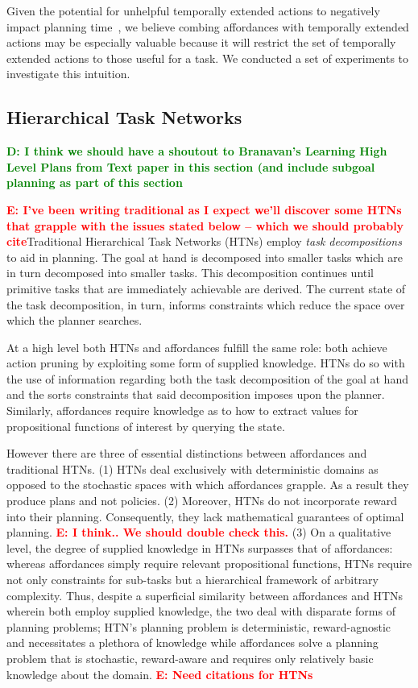 \documentclass[conference]{IEEEtran}
\newcommand{\dnote}[1]{\textcolor{Green}{\textbf{D: #1}}}
\newcommand{\enote}[1]{\textcolor{Red}{\textbf{E: #1}}}
\begin{document}
Given the potential for unhelpful temporally extended actions to negatively impact planning time~\cite{Jong:2008zr}, we believe combing affordances with temporally extended actions
may be especially valuable because it will restrict the set of temporally extended actions to those
useful for a task. We conducted a set of experiments to investigate this intuition.

\subsection{Hierarchical Task Networks}

\dnote{I think we should have a shoutout to Branavan's Learning High Level Plans from Text paper in this section (and include subgoal planning as part of this section}

\enote{I've been writing traditional as I expect we'll discover some HTNs that grapple with the issues stated below -- which we should probably cite}Traditional Hierarchical Task Networks (HTNs) employ \textit{task decompositions} to aid in planning. The goal at hand is decomposed into smaller tasks which are in turn decomposed into smaller tasks. This decomposition continues until primitive tasks that are immediately achievable are derived. The current state of the task decomposition, in turn, informs constraints which reduce the space over which the planner searches.

At a high level both HTNs and affordances fulfill the same role: both achieve action pruning by exploiting some form of supplied knowledge. HTNs do so with the use of information regarding both the task decomposition of the goal at hand and the sorts constraints that said decomposition imposes upon the planner. Similarly, affordances require knowledge as to how to extract values for propositional functions of interest by querying the state.

However there are three of essential distinctions between affordances and traditional HTNs. (1) HTNs deal exclusively with deterministic domains as opposed to the stochastic spaces with which affordances grapple. As a result they produce plans and not policies. (2) Moreover, HTNs do not incorporate reward into their planning. Consequently, they lack mathematical guarantees of optimal planning. \enote{I think.. We should double check this.} (3) On a qualitative level, the degree of supplied knowledge in HTNs surpasses that of affordances: whereas affordances simply require relevant propositional functions, HTNs require not only constraints for sub-tasks but a hierarchical framework of arbitrary complexity. Thus, despite a superficial similarity between affordances and HTNs wherein both employ supplied knowledge, the two deal with disparate forms of planning problems; HTN's planning problem is deterministic, reward-agnostic and necessitates a plethora of knowledge while affordances solve a planning problem that is stochastic, reward-aware and requires only relatively basic knowledge about the domain.
\enote{Need citations for HTNs}
\end{document}
